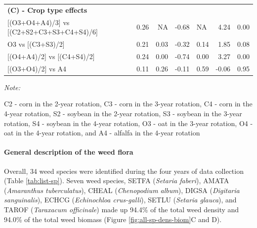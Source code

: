 \documentclass[
]{article}
\begin{document}
\begin{table}
\begin{threeparttable}
\begin{tabular}[t]{lrrrlrr}
\multicolumn{7}{l}{\textbf{(C) - Crop type effects}}\\
\hspace{1em}{}[(O3+O4+A4)/3] vs [(C2+S2+C3+S3+C4+S4)/6] & 0.26 & NA & -0.68 & NA & 4.24 & 0.00\\
\hspace{1em}O3 vs [(C3+S3)/2] & 0.21 & 0.03 & -0.32 & 0.14 & 1.85 & 0.08\\
\hspace{1em}{}[(O4+A4)/2] vs [(C4+S4)/2] & 0.24 & 0.00 & -0.74 & 0.00 & 3.27 & 0.00\\
\hspace{1em}{}[(O3+O4)/2] vs A4 & 0.11 & 0.26 & -0.11 & 0.59 & -0.06 & 0.95\\
\bottomrule
\end{tabular}
\begin{tablenotes}[para]
\item \textit{Note: } 
\item C2 - corn in the 2-year rotation, C3 - corn in the 3-year rotation, C4 - corn in the 4-year rotation, S2 - soybean in the 2-year rotation, S3 - soybean in the 3-year rotation, S4 - soybean in the 4-year rotation, O3 - oat in the 3-year rotation, O4 - oat in the 4-year rotation, and A4 - alfalfa in the 4-year rotation
\end{tablenotes}
\end{threeparttable}
\end{table}

\paragraph*{General description of the weed flora}\label{general-description-of-the-weed-flora}

Overall, 34 weed species were identified during the four years of data collection (Table \ref{tab:list-sp}). Seven weed species, SETFA (\emph{Setaria faberi}), AMATA (\emph{Amaranthus tuberculatus}), CHEAL (\emph{Chenopodium album}), DIGSA (\emph{Digitaria sanguinalis}), ECHCG (\emph{Echinochloa crus-galli}), SETLU (\emph{Setaria glauca}), and TAROF (\emph{Taraxacum officinale}) made up 94.4\% of the total weed density and 94.0\% of the total weed biomass (Figure \ref{fig:all-sp-dens-biom}C and D).
\end{document}
